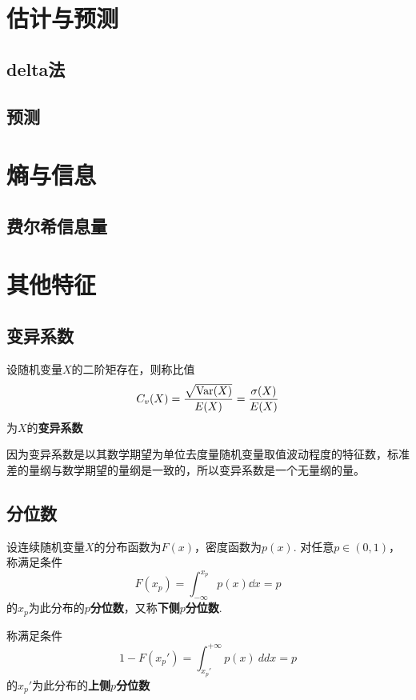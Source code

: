\section{估计与预测}

\subsection{delta法}

\subsection{预测}

\section{熵与信息}

\subsection{费尔希信息量}



\section{其他特征}

\subsection{变异系数}

\begin{definition}[变异系数]
    设随机变量$X$的二阶矩存在，则称比值
    \[ C_v(X) = \frac{\sqrt{\operatorname{Var}(X)}}{E(X)} = \frac{\sigma(X)}{E(X)} \]
    为$X$的\textbf{变异系数}
\end{definition}

因为变异系数是以其数学期望为单位去度量随机变量取值波动程度的特征数，标准差的量纲与数学期望的量纲是一致的，所以变异系数是一个无量纲的量。

\subsection{分位数}

\begin{definition}[分位数]
    设连续随机变量$X$的分布函数为$F(x)$，密度函数为$p(x)$. 对任意$p\in(0,1)$，称满足条件
    \[ F(x_p) = \int_{-\infty}^{x_p}p(x)\dd x = p \]
    的$x_p$为此分布的\textbf{$p$分位数}，又称\textbf{下侧$p$分位数}.

    称满足条件
    \[ 1 - F(x_p') = \int_{x_p'}^{+\infty} p(x)\ dd x = p \]
    的$x_p'$为此分布的\textbf{上侧$p$分位数}
\end{definition}

